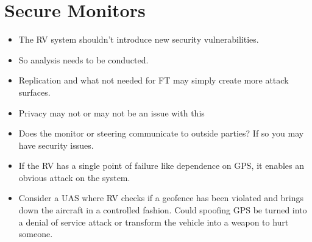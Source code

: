 \section{Secure Monitors} \label{sec:secure} 

\noindent{}

\begin{itemize}
\item The RV system shouldn't introduce new security vulnerabilities.
\item So analysis needs to be conducted.
\item Replication and what not needed for FT may simply create more
attack surfaces. 
\item Privacy may not or may not be an issue with this  
\item Does the monitor or steering communicate to outside parties? If
so you may have security issues. 
\item If the RV has a single point of failure like dependence on GPS,
it enables an obvious attack on the system. 
\item Consider a UAS where RV checks if a geofence has been violated
and brings down the aircraft in a controlled fashion. Could spoofing
GPS be turned into a denial of service attack or transform the vehicle
into a weapon to hurt someone. 
\end{itemize}